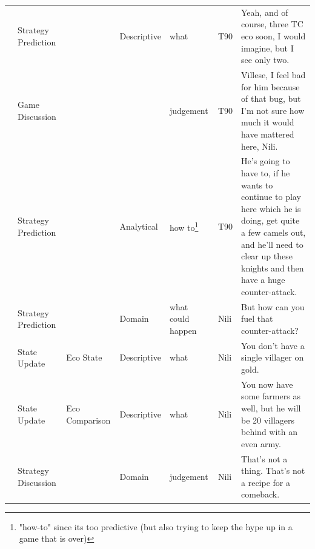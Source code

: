 {\begin{longtable}{@{}>{\theAppRow}r|L{2.3cm}L{2.2cm}L{1.4cm}L{2.2cm}L{0.5cm}U{5.6cm}@{}}
    & Strategy Prediction   &                      & Descriptive   & what              & T90     & Yeah, and of course, three TC eco soon, I would imagine, but I see only two.                                                                                                                                             \\
    & Game Discussion       &                      &             & judgement         & T90     & Villese, I feel bad for him because of that bug, but I'm not sure how much it would have mattered here, Nili.                                                                                                            \\
    & Strategy Prediction   &                      & Analytical  & how to\footnote{"how-to" since its too predictive (but also trying to keep the hype up in a game that is over)}            & T90     & He's going to have to, if he wants to continue to play here which he is doing, get quite a few camels out, and he'll need to clear up these knights and then have a huge counter-attack.                                 \\
    & Strategy Prediction   &                      & Domain      & what could happen & Nili    & But how can you fuel that counter-attack?                                                                                                                                                                                \\
    & State Update          & Eco State                     & Descriptive   & what              & Nili    & You don't have a single villager on gold.                                                                                                                                                                                \\
    & State Update          & Eco Comparison                     & Descriptive   & what              & Nili    & You now have some farmers as well, but he will be 20 villagers behind with an even army.                                                                                                                                 \\
    & Strategy Discussion   &                      & Domain      & judgement         & Nili    & That's not a thing. That's not a recipe for a comeback.                                                                                                                                                                  \\

\end{longtable}}
